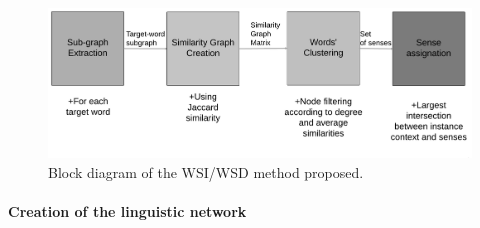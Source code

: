 \begin{figure}
\centering
\includegraphics[width=1\linewidth]{images/Chapitre4/wsd_wsi_process.png}
\caption{Block diagram of the WSI/WSD method proposed.}
\label{fig:wsd_wsi_process}
\end{figure}


\paragraph{Creation of the linguistic network}


